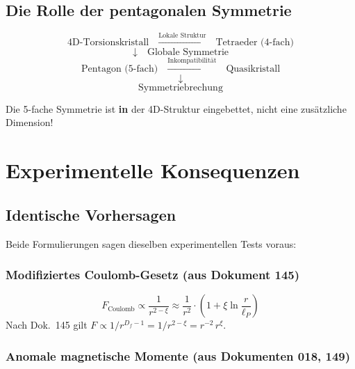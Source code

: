 	\subsection{Die Rolle der pentagonalen Symmetrie}
	
	\begin{equation}
		\text{4D-Torsionskristall} \quad \xrightarrow{\text{Lokale Struktur}} \quad \text{Tetraeder (4-fach)}
	\end{equation}
	\begin{equation}
		\downarrow \quad \text{Globale Symmetrie}
	\end{equation}
	\begin{equation}
		\text{Pentagon (5-fach)} \quad \xrightarrow{\text{Inkompatibilität}} \quad \text{Quasikristall}
	\end{equation}
	\begin{equation}
		\downarrow
	\end{equation}
	\begin{equation}
		\text{Symmetriebrechung}
	\end{equation}
	
	Die 5-fache Symmetrie ist \textbf{in} der 4D-Struktur eingebettet, nicht eine zusätzliche Dimension!
	
	\section{Experimentelle Konsequenzen}
	
	\subsection{Identische Vorhersagen}
	
	Beide Formulierungen sagen dieselben experimentellen Tests voraus:
	
	\subsubsection{Modifiziertes Coulomb-Gesetz (aus Dokument 145)}
	
	\begin{equation}
		F_{\text{Coulomb}} \propto \frac{1}{r^{2-\xi}} \approx \frac{1}{r^{2}} \cdot \left(1 + \xi \ln\frac{r}{\ell_P}\right)
	\end{equation}
	Nach Dok.~145 gilt $F \propto 1/r^{D_f-1} = 1/r^{2-\xi} = r^{-2}\,r^{\xi}$.
	
	\subsubsection{Anomale magnetische Momente (aus Dokumenten 018, 149)}
	
